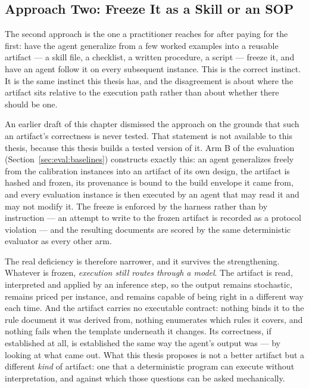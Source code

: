 \subsection{Approach Two: Freeze It as a Skill or an SOP}
\label{sec:intro:existing:skill}

The second approach is the one a practitioner reaches for after paying for the first: have
the agent generalize from a few worked examples into a reusable artifact --- a skill file, a
checklist, a written procedure, a script --- freeze it, and have an agent follow it on every
subsequent instance. This is the correct instinct. It is the same instinct this thesis has,
and the disagreement is about where the artifact sits relative to the execution path rather
than about whether there should be one.

An earlier draft of this chapter dismissed the approach on the grounds that such an
artifact's correctness is never tested. That statement is not available to this thesis,
because this thesis builds a tested version of it. Arm B of the evaluation
(Section~\ref{sec:eval:baselines}) constructs exactly this: an agent generalizes freely from
the calibration instances into an artifact of its own design, the artifact is hashed and
frozen, its provenance is bound to the build envelope it came from, and every evaluation
instance is then executed by an agent that may read it and may not modify it. The freeze is
enforced by the harness rather than by instruction --- an attempt to write to the frozen
artifact is recorded as a protocol violation --- and the resulting documents are scored by
the same deterministic evaluator as every other arm.

The real deficiency is therefore narrower, and it survives the strengthening. Whatever is
frozen, \emph{execution still routes through a model}. The artifact is read, interpreted and
applied by an inference step, so the output remains stochastic, remains priced per instance,
and remains capable of being right in a different way each time. And the artifact carries no
executable contract: nothing binds it to the rule document it was derived from, nothing
enumerates which rules it covers, and nothing fails when the template underneath it changes.
Its correctness, if established at all, is established the same way the agent's output was
--- by looking at what came out. What this thesis proposes is not a better artifact but a
different \emph{kind} of artifact: one that a deterministic program can execute without
interpretation, and against which those questions can be asked mechanically.

